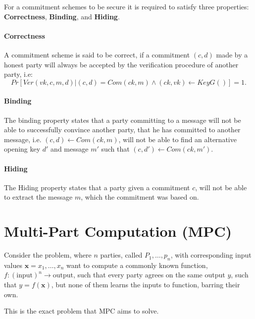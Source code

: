 For a commitment schemes to be secure it is required to satisfy three
properties: \textbf{Correctness}, \textbf{Binding}, and \textbf{Hiding}.

\paragraph{Correctness}
A commitment scheme is said to be correct, if a commitment $(c, d)$ made by a
honest party will always be accepted by the verification procedure of another
party, i.e:
$$
Pr[Ver(vk, c, m, d) | (c, d) = Com(ck, m) \land (ck, vk) \leftarrow KeyG()] = 1.
$$

\paragraph{Binding}
The binding property states that a party committing to a message will not be
able to successfully convince another party, that he has committed to another
message, i.e. $(c, d) \leftarrow Com(ck, m)$, will not be able to find an alternative opening key $d'$
and message $m'$ such that $(c, d') \leftarrow Com(ck, m')$.




\paragraph{Hiding}
The Hiding property states that a party given a commitment $c$, will not be able
to extract the message $m$, which the commitment was based on.

\section{Multi-Part Computation (MPC)}
\label{sec:background:mpc}
Consider the problem, where $n$ parties, called $P_{1}, \dots, p_{n}$, with
corresponding input values $\textbf{x} = x_{1}, \dots, x_{n}$ want to compute a commonly
known function, $f : (\text{input})^{n} \rightarrow \text{output}$, such that
every party agrees on the same output $y$, such that $y = f(\textbf{x})$, but none of them learns the inputs to function, barring their own.


This is the exact problem that MPC aims to solve.

\begin{definition}[Correctness]
\label{def:mpc:correctness}

\end{definition}

\begin{definition}[d-Privacy]
\label{def:mpc:d-privacy}

\end{definition}

